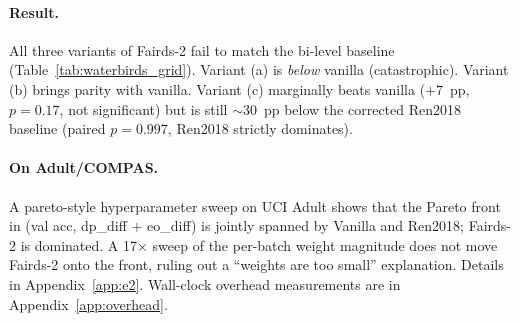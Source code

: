 \paragraph{Result.}
All three variants of Fairds-2 fail to match the bi-level baseline
(Table~\ref{tab:waterbirds_grid}). Variant (a) is \emph{below} vanilla
(catastrophic). Variant (b) brings parity with vanilla. Variant (c)
marginally beats vanilla ($+7$~pp, $p\!=\!0.17$, not significant) but is
still $\sim\!30$~pp below the corrected Ren2018 baseline (paired
$p\!=\!0.997$, Ren2018 strictly dominates).

\begin{table}[t]
\centering\small

\caption{\textbf{Waterbirds OOD test\_worst} across three Fairds variants
(mean $\pm$ std, 3 seeds). Higher is better. Fairds variants do not
approach Ren2018; the regime-boundary diagnosis is in
Section~\ref{sec:discussion}.}
\label{tab:waterbirds_grid}
\end{table}

\paragraph{On Adult/COMPAS.}
A pareto-style hyperparameter sweep on UCI Adult shows that the
Pareto front in (val acc, dp\_diff $+$ eo\_diff) is jointly spanned
by Vanilla and Ren2018; Fairds-2 is dominated. A 17$\times$ sweep of
the per-batch weight magnitude does not move Fairds-2 onto the
front, ruling out a ``weights are too small'' explanation. Details
in Appendix~\ref{app:e2}. Wall-clock overhead measurements are in
Appendix~\ref{app:overhead}.
